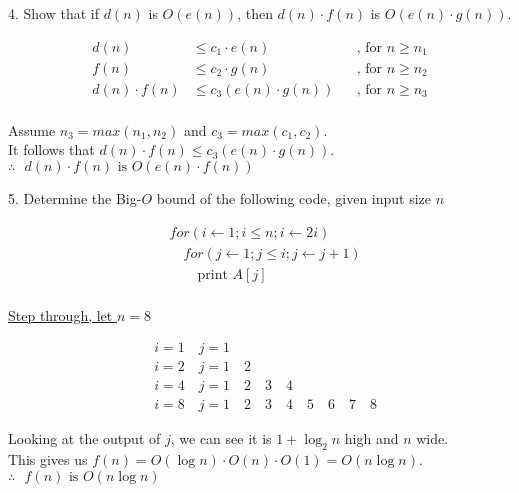\documentclass[12pt]{article}
\begin{document}
\begin{flushleft}
4. Show that if $ d(n) $ is $ O(e(n)) $, then $ d(n)\cdot f(n) $ is $ O(e(n)\cdot g(n))$.
\end{flushleft}
\begin{align*}
d(n) &\leq c_{1} \cdot e(n) &&\text{, for } n\geq n_{1}\\
f(n) &\leq c_{2} \cdot g(n) &&\text{, for } n\geq n_{2}\\
d(n) \cdot f(n) &\leq c_{3}(e(n)\cdot g(n)) &&\text{, for } n\geq n_{3}\\ 
\end{align*}
\begin{center}
Assume $n_{3}=max(n_{1},n_{2})$ and $c_{3}=max(c_{1},c_{2})$.\\
It follows that $d(n) \cdot f(n) \leq c_{3}(e(n)\cdot g(n))$.\\
$\therefore \text{ } d(n) \cdot f(n) \text{ is } O(e(n)\cdot f(n))$\\[1.5in]
\end{center}

\begin{flushleft}
5. Determine the Big-$O$ bound of the following code, given input size $n$
\end{flushleft}
\begin{align*}
&for(i\leftarrow 1; i \leq n; i \leftarrow 2i)\\
&\quad for(j \leftarrow 1;j\leq i; j \leftarrow j+1)\\
&\qquad \text{print } A[j]\\
\end{align*}
\begin{center}
\underline{Step through, let $n=8$}
\end{center}
\begin{align*}
&i=1 \quad j=1\\
&i=2 \quad j=1 \quad 2 \\
&i=4 \quad j=1 \quad 2 \quad 3 \quad 4 \\
&i=8 \quad j=1 \quad 2 \quad 3 \quad 4 \quad 5 \quad 6 \quad 7 \quad 8
\end{align*}
\begin{center}
Looking at the output of $j$, we can see it is $1+\log_{2}n$ high and $n$ wide.\\
This gives us $f(n)=O(\log n)\cdot O(n)\cdot O(1)=O(n\log n)$.\\
$\therefore \text{ } f(n) \text{ is } O(n\log n)$
\end{center}
\newpage
\end{document}
